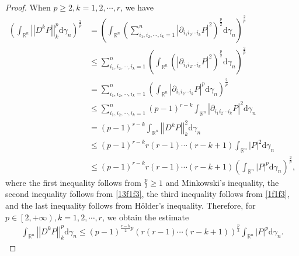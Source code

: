 \documentclass[12pt]{article}
\theoremstyle{plain}
\theoremstyle{definition}
\theoremstyle{remark}
\numberwithin{equation}{section}
\begin{document}
\begin{proof}
When $p\geqslant 2,k=1,2,\cdots,r$, we have
$$\begin{aligned}\left( \int_{\mathbb{R}^{n}} \left| \left| D^{k}P \right| \right|_{k}^{p} \mathrm{d} \gamma_{n} \right)^{\frac{2}{p}}&=\left( \int_{\mathbb{R}^{n}} \left( \sum_{i_{1},i_{2},\cdots ,i_{k}=1}^{n} \left| \partial_{i_{1}i_{2}\cdots i_{k}} P \right|^{2} \right)^{\frac{p}{2}} \mathrm{d} \gamma_{n} \right)^{\frac{2}{p}}\\ &\leqslant \sum_{i_{1},i_{2},\cdots ,i_{k}=1}^{n} \left( \int_{\mathbb{R}^{n}} \left( \left| \partial_{i_{1}i_{2}\cdots i_{k}} P \right|^{2} \right)^{\frac{p}{2}} \mathrm{d} \gamma_{n} \right)^{\frac{2}{p}}\\ &=\sum_{i_{1},i_{2},\cdots ,i_{k}=1}^{n} \left( \int_{\mathbb{R}^{n}} \left| \partial_{i_{1}i_{2}\cdots i_{k}} P \right|^{p} \mathrm{d} \gamma_{n} \right)^{\frac{2}{p}}\\ &\leqslant \sum_{i_{1},i_{2},\cdots ,i_{k}=1}^{n} \left( p-1 \right)^{r-k} \int_{\mathbb{R}^{n}} \left| \partial_{i_{1}i_{2}\cdots i_{k}} P \right|^{2} \mathrm{d} \gamma_{n}\\ &=\left( p-1 \right)^{r-k} \int_{\mathbb{R}^{n}} \left| \left| D^{k}P \right| \right|_{k}^{2} \mathrm{d} \gamma_{n}\\ &\leqslant \left( p-1 \right)^{r-k} r\left( r-1 \right) \cdots \left( r-k+1 \right) \int_{\mathbb{R}^{n}} \left| P \right|^{2} \mathrm{d} \gamma_{n}\\ &\leqslant \left( p-1 \right)^{r-k} r\left( r-1 \right) \cdots \left( r-k+1 \right) \left( \int_{\mathbb{R}^{n}} \left| P \right|^{p} \mathrm{d} \gamma_{n} \right)^{\frac{2}{p}} ,\end{aligned}$$
where the first inequality follows from $\frac{p}{2} \geqslant 1$ and Minkowski's inequality, the second inequality follows from \eqref{13f1f3}, the third inequality follows from \eqref{1f1f3}, and the last inequality follows from Hölder's inequality. Therefore, for $p\in \left[ 2,+\infty \right),k=1,2,\cdots ,r$, we obtain the estimate
\begin{eqnarray}
	\int_{\mathbb{R}^{n}} \left| \left| D^{k}P \right| \right|_{k}^{p} \mathrm{d} \gamma_{n} \leqslant \left( p-1 \right)^{\frac{r-k}{2} p} \left( r\left( r-1 \right) \cdots \left( r-k+1 \right) \right)^{\frac{p}{2}} \int_{\mathbb{R}^{n}} \left| P \right|^{p} \mathrm{d} \gamma_{n}.\label{11}
\end{eqnarray}	


\end{proof}
\end{document}
